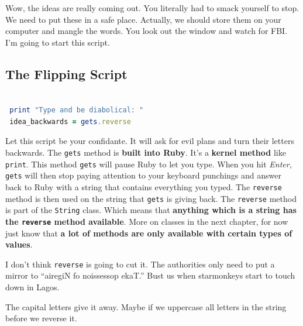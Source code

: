 \documentclass[10pt,twoside]{report}
\begin{document}
Wow, the ideas are really coming out.  You literally had to smack
yourself to stop.  We need to put these in a safe place.  Actually, we
should store them on your computer and mangle the words.  You look out
the window and watch for FBI.  I'm going to start this script.



\subsection{The Flipping Script}




\begin{lstlisting}[basicstyle=\ttfamily\color{basiccolor},
    commentstyle = \ttfamily\color{commentcolor},
    keywordstyle=\ttfamily\color{keywordscolor},
    stringstyle=\color{stringcolor},
    language=Ruby,
    basicstyle=\small\ttfamily,
    showstringspaces=false,
  ]

 print "Type and be diabolical: " 
 idea_backwards = gets.reverse

\end{lstlisting}


Let this script be your confidante.  It will ask for evil plans and
turn their letters backwards. The \lstinline[breaklines=true]|gets|
method is {\bf built into Ruby}.  It's a {\bf kernel method} like
\lstinline[breaklines=true]|print|.  This method
\lstinline[breaklines=true]|gets| will pause Ruby to let you type.
When you hit {\em Enter}, \lstinline[breaklines=true]|gets| will then
stop paying attention to your keyboard punchings and answer back to
Ruby with a string that contains everything you typed.  The
\lstinline[breaklines=true]|reverse| method is then used on the string
that \lstinline[breaklines=true]|gets| is giving back.  The
\lstinline[breaklines=true]|reverse| method is part of the
\lstinline[breaklines=true]|String| class.  Which means that {\bf
  anything which is a string has the
  \lstinline[breaklines=true]|reverse| method available}.  More on
classes in the next chapter, for now just know that {\bf a lot of
  methods are only available with certain types of values}.

I don't think \lstinline[breaklines=true]|reverse| is going to cut it.
The authorities only need to put a mirror to ``airegiN fo noissessop
ekaT.''  Bust us when starmonkeys start to touch down in Lagos.

The capital letters give it away.  Maybe if we uppercase all letters
in the string before we reverse it.
\end{document}
